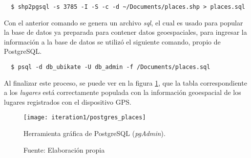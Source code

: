 \begin{verbatim}
  $ shp2pgsql -s 3785 -I -S -c -d ~/Documents/places.shp > places.sql
\end{verbatim}

Con el anterior comando se genera un archivo \emph{sql}, el cual es usado para popular la base de datos ya preparada para contener datos geoespaciales, para ingresar la información a la base de datos se utilizó el siguiente comando, propio de PostgreSQL.


%
%
\begin{verbatim}
  $ psql -d db_ubikate -U db_admin -f /Documents/places.sql
\end{verbatim}

Al finalizar este proceso, se puede ver en la figura \ref{fig:postgres_places}, que la tabla correspondiente a los \emph{lugares} está correctamente populada con la información geoespacial de los lugares registrados con el dispositivo GPS.

\begin{figure}[H]
  \begin{center}
    \texttt{[image: iteration1/postgres\_places]}
    \caption{Herramienta gráfica de PostgreSQL (\emph{pgAdmin}).}
    \label{fig:postgres_places}
    \caption*{Fuente: Elaboración propia}
  \end{center}
\end{figure}
%


